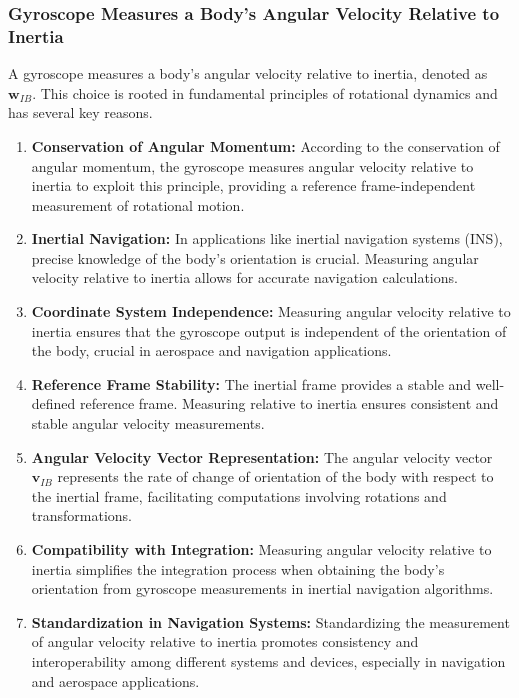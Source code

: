 \subsubsection{Gyroscope Measures a Body's Angular Velocity Relative to Inertia}

A gyroscope measures a body's angular velocity relative to inertia, denoted as \( \mathbf{w}_{IB} \). This choice is rooted in fundamental principles of rotational dynamics and has several key reasons.

\begin{enumerate}
  \item \textbf{Conservation of Angular Momentum:}
    According to the conservation of angular momentum, the gyroscope measures angular velocity relative to inertia to exploit this principle, providing a reference frame-independent measurement of rotational motion.

  \item \textbf{Inertial Navigation:}
    In applications like inertial navigation systems (INS), precise knowledge of the body's orientation is crucial. Measuring angular velocity relative to inertia allows for accurate navigation calculations.

  \item \textbf{Coordinate System Independence:}
    Measuring angular velocity relative to inertia ensures that the gyroscope output is independent of the orientation of the body, crucial in aerospace and navigation applications.

  \item \textbf{Reference Frame Stability:}
    The inertial frame provides a stable and well-defined reference frame. Measuring relative to inertia ensures consistent and stable angular velocity measurements.

  \item \textbf{Angular Velocity Vector Representation:}
    The angular velocity vector \( \mathbf{v}_{IB} \) represents the rate of change of orientation of the body with respect to the inertial frame, facilitating computations involving rotations and transformations.

  \item \textbf{Compatibility with Integration:}
    Measuring angular velocity relative to inertia simplifies the integration process when obtaining the body's orientation from gyroscope measurements in inertial navigation algorithms.

  \item \textbf{Standardization in Navigation Systems:}
    Standardizing the measurement of angular velocity relative to inertia promotes consistency and interoperability among different systems and devices, especially in navigation and aerospace applications.
\end{enumerate}

